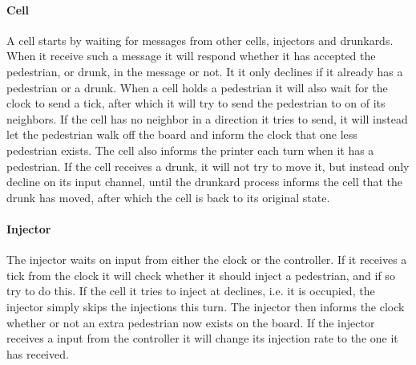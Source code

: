 \documentclass[a4paper, 11pt]{article}
\begin{document}
\paragraph{Cell} %
\label{par:cell}
A cell starts by waiting for messages from other cells, injectors and drunkards. When it receive such a message it will respond whether it has accepted the pedestrian, or drunk, in the message or not. It it only declines if it already has a pedestrian or a drunk. When a cell holds a pedestrian it will also wait for the clock to send a tick, after which it will try to send the pedestrian to on of its neighbors. If the cell has no neighbor in a direction it tries to send, it will instead let the pedestrian walk off the board and inform the clock that one less pedestrian exists. The cell also informs the printer each turn when it has a pedestrian. If the cell receives a drunk, it will not try to move it, but instead only decline on its input channel, until the drunkard process informs the cell that the drunk has moved, after which the cell is back to its original state.

\paragraph{Injector} %
\label{par:injector}
The injector waits on input from either the clock or the controller. If it receives a tick from the clock it will check whether it should inject a pedestrian, and if so try to do this. If the cell it tries to inject at declines, i.e. it is occupied, the injector simply skips the injections this turn. The injector then informs the clock whether or not an extra pedestrian now exists on the board. If the injector receives a input from the controller it will change its injection rate to the one it has received.
\end{document}
